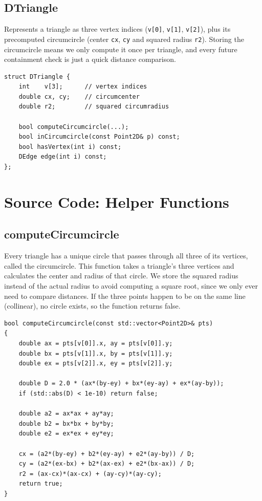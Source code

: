 \documentclass[12pt]{extreport}
\begin{document}
\subsection{DTriangle}
Represents a triangle as three vertex indices (\texttt{v[0]}, \texttt{v[1]}, \texttt{v[2]}), plus its precomputed circumcircle (center \texttt{cx}, \texttt{cy} and squared radius \texttt{r2}). Storing the circumcircle means we only compute it once per triangle, and every future containment check is just a quick distance comparison.

\begin{lstlisting}[style=cppstyle]
struct DTriangle {
    int    v[3];      // vertex indices
    double cx, cy;    // circumcenter
    double r2;        // squared circumradius

    bool computeCircumcircle(...);
    bool inCircumcircle(const Point2D& p) const;
    bool hasVertex(int i) const;
    DEdge edge(int i) const;
};
\end{lstlisting}

\section{Source Code: Helper Functions}

\subsection{computeCircumcircle}
Every triangle has a unique circle that passes through all three of its vertices, called the circumcircle. This function takes a triangle's three vertices and calculates the center and radius of that circle. We store the squared radius instead of the actual radius to avoid computing a square root, since we only ever need to compare distances. If the three points happen to be on the same line (collinear), no circle exists, so the function returns false.

\begin{lstlisting}[style=cppstyle]
bool computeCircumcircle(const std::vector<Point2D>& pts)
{
    double ax = pts[v[0]].x, ay = pts[v[0]].y;
    double bx = pts[v[1]].x, by = pts[v[1]].y;
    double ex = pts[v[2]].x, ey = pts[v[2]].y;

    double D = 2.0 * (ax*(by-ey) + bx*(ey-ay) + ex*(ay-by));
    if (std::abs(D) < 1e-10) return false;

    double a2 = ax*ax + ay*ay;
    double b2 = bx*bx + by*by;
    double e2 = ex*ex + ey*ey;

    cx = (a2*(by-ey) + b2*(ey-ay) + e2*(ay-by)) / D;
    cy = (a2*(ex-bx) + b2*(ax-ex) + e2*(bx-ax)) / D;
    r2 = (ax-cx)*(ax-cx) + (ay-cy)*(ay-cy);
    return true;
}
\end{lstlisting}
\end{document}
